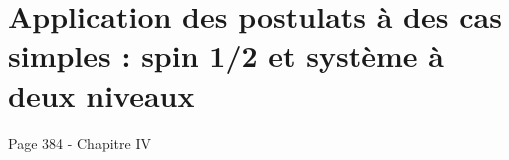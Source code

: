 \chapter{Application des postulats à des cas simples : spin 1/2 et système à
deux niveaux}
\label{chapter:application_spin_demi_systeme_deux_niveaux}
Page 384 - Chapitre IV
